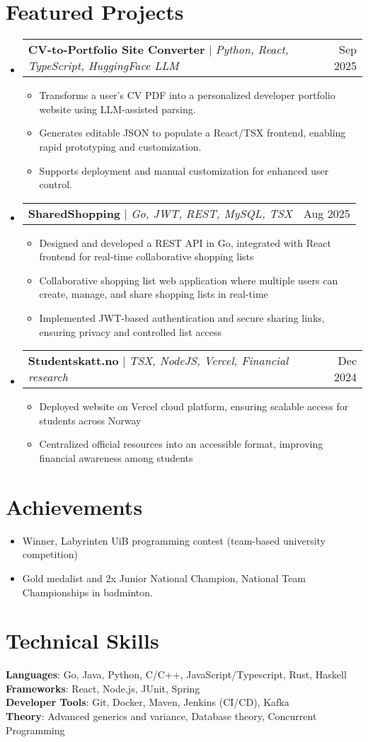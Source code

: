\documentclass[letterpaper,11pt]{article}
\makeatletter
\newcommand{\resumeItem}[1]{
  \item\small{
    {#1 \vspace{-2pt}}
  }
}
\newcommand{\resumeProjectHeading}[2]{
    \item
    \begin{tabular*}{0.97\textwidth}{l@{\extracolsep{\fill}}r}
      \small#1 & #2 \\
    \end{tabular*}\vspace{-7pt}
}
\newcommand{\resumeSubHeadingListStart}{\begin{itemize}[leftmargin=0.15in, label={}]}
\newcommand{\resumeSubHeadingListEnd}{\end{itemize}}
\newcommand{\resumeItemListStart}{\begin{itemize}}
\newcommand{\resumeItemListEnd}{\end{itemize}\vspace{-5pt}}
\makeatother
\begin{document}
\section{Featured Projects}
    \resumeSubHeadingListStart
    \resumeProjectHeading
    {\textbf{CV-to-Portfolio Site Converter} $|$ \emph{Python, React, TypeScript, HuggingFace LLM}}{Sep 2025}
    \resumeItemListStart
      \resumeItem{Transforms a user's CV PDF into a personalized developer portfolio website using LLM-assisted parsing.}
      \resumeItem{Generates editable JSON to populate a React/TSX frontend, enabling rapid prototyping and customization.}
      \resumeItem{Supports deployment and manual customization for enhanced user control.}
    \resumeItemListEnd
      \resumeProjectHeading
          {\textbf{SharedShopping} $|$ \emph{Go, JWT, REST, MySQL, TSX}}{Aug 2025}
          \resumeItemListStart
            \resumeItem{Designed and developed a REST API in Go, integrated with React frontend for real-time collaborative shopping lists}
            \resumeItem{Collaborative shopping list web application where multiple users can create, manage, and share shopping lists in real-time}
            \resumeItem{Implemented JWT-based authentication and secure sharing links, ensuring privacy and controlled list access}
          \resumeItemListEnd
      \resumeProjectHeading
          {\textbf{Studentskatt.no} $|$ \emph{TSX, NodeJS, Vercel, Financial research}}{Dec 2024}
          \resumeItemListStart
            \resumeItem{Deployed website on Vercel cloud platform, ensuring scalable access for students across Norway}
            \resumeItem{Centralized official resources into an accessible format, improving financial awareness among students}
          \resumeItemListEnd
    \resumeSubHeadingListEnd
    
\section{Achievements}
 \resumeSubHeadingListStart
 \resumeItemListStart
    \resumeItem{Winner, Labyrinten UiB programming contest (team-based university competition)}
    \resumeItem{Gold medalist and 2x Junior National Champion, National Team Championships in badminton.}
 \resumeItemListEnd
\resumeSubHeadingListEnd

%
\section{Technical Skills}
 \begin{itemize}[leftmargin=0.15in, label={}]
    \small{\item{
     \textbf{Languages}{: Go, Java, Python, C/C++, JavaScript/Typescript, Rust, Haskell} \\
     \textbf{Frameworks}{: React, Node.js, JUnit, Spring} \\
     \textbf{Developer Tools}{: Git, Docker, Maven, Jenkins (CI/CD), Kafka} \\
     \textbf{Theory}{: Advanced generics and variance, Database theory, Concurrent Programming}
    }}
 \end{itemize}


\end{document}
